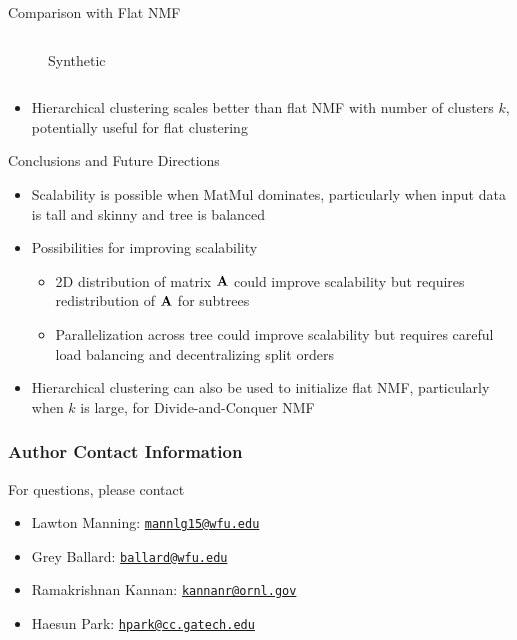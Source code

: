 \documentclass{beamer}
\newcommand{\email}[1]{\href{mailto:#1}{\texttt{#1}}}
\begin{document}
\begin{frame}{Comparison with Flat NMF}
\begin{columns}
\begin{column}{0.5\textwidth}
\begin{figure}
            \caption{Synthetic}
            \end{figure}
        \end{column}
    \end{columns}

\vfill
    
\begin{itemize}
    \item Hierarchical clustering scales better than flat NMF with number of clusters $k$, potentially useful for flat clustering
\end{itemize}
    
\end{frame}

\begin{frame}{Conclusions and Future Directions}

\begin{itemize}
	\item Scalability is possible when MatMul dominates, particularly when input data is tall and skinny and tree is balanced
	\vfill
	\item Possibilities for improving scalability
	\begin{itemize}
		\item 2D distribution of matrix $\M{A}$ could improve scalability but requires redistribution of $\M{A}$ for subtrees
		\item Parallelization across tree could improve scalability but requires careful load balancing and decentralizing split orders
	\end{itemize}
	\vfill
	\item Hierarchical clustering can also be used to initialize flat NMF, particularly when $k$ is large, for Divide-and-Conquer NMF
\end{itemize}

\end{frame}



\begin{frame}
    \frametitle{Author Contact Information}
    
    For questions, please contact
    \begin{itemize}
        \item Lawton Manning: \email{mannlg15@wfu.edu}
        \item Grey Ballard: \email{ballard@wfu.edu}
        \item Ramakrishnan Kannan: \email{kannanr@ornl.gov}
        \item Haesun Park: \email{hpark@cc.gatech.edu}
    \end{itemize}
    
\end{frame}
    
\end{document}
